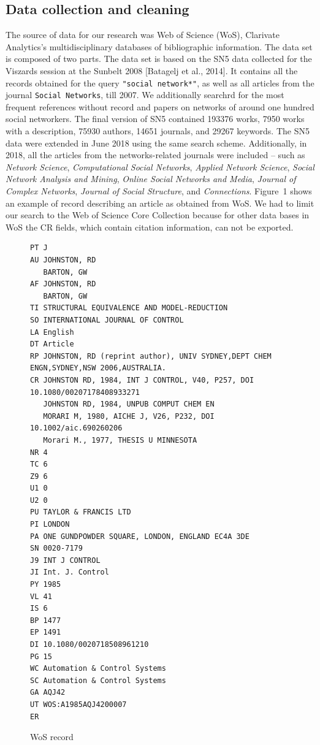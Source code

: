 \documentclass[11pt]{article} %
\newcommand{\Remark}[1]{\ifodd\value{page} \normalmarginpar
 \else \reversemarginpar \fi \marginpar{{\footnotesize #1}} }
\begin{document}
\subsection{Data collection and cleaning}

The source of data for our research was Web of Science (WoS), Clarivate Analytics’s multidisciplinary databases of bibliographic information. The data set is composed of two parts. The data set is based on the  SN5 data collected for the Viszards session at the Sunbelt 2008 [Batagelj et al., 2014]. It contains all the records obtained for the query  \texttt {"social network*"}, as well as all articles from the journal \texttt{Social Networks}, till 2007. We additionally searchrd for the most frequent references without record and papers on networks of around one hundred social networkers. The final version of SN5 contained
 193376 works,  7950 works with a description,  75930 authors,  14651 journals, and  29267 keywords.
The SN5 data were extended  in June 2018 using the same search scheme. Additionally, in 2018, all the articles from the networks-related journals were included -- such as  \textit{Network Science}, \textit{Computational Social Networks}, \textit{Applied Network Science}, \textit{Social Network Analysis and Mining}, \textit{Online Social Networks and Media}, \textit{Journal of Complex  Networks}, \textit{Journal of Social Structure}, and \textit{Connections}. Figure~1 shows an example of record describing an article as obtained from WoS. We had to limit our search to the Web of Science Core Collection because for other data bases in WoS the CR fields, which contain citation information, can not be exported.\Remark{other example?}


\begin{figure}
\renewcommand{\baselinestretch}{0.8}
\scriptsize
\begin{verbatim}
PT J
AU JOHNSTON, RD
   BARTON, GW
AF JOHNSTON, RD
   BARTON, GW
TI STRUCTURAL EQUIVALENCE AND MODEL-REDUCTION
SO INTERNATIONAL JOURNAL OF CONTROL
LA English
DT Article
RP JOHNSTON, RD (reprint author), UNIV SYDNEY,DEPT CHEM ENGN,SYDNEY,NSW 2006,AUSTRALIA.
CR JOHNSTON RD, 1984, INT J CONTROL, V40, P257, DOI 10.1080/00207178408933271
   JOHNSTON RD, 1984, UNPUB COMPUT CHEM EN
   MORARI M, 1980, AICHE J, V26, P232, DOI 10.1002/aic.690260206
   Morari M., 1977, THESIS U MINNESOTA
NR 4
TC 6
Z9 6
U1 0
U2 0
PU TAYLOR & FRANCIS LTD
PI LONDON
PA ONE GUNDPOWDER SQUARE, LONDON, ENGLAND EC4A 3DE
SN 0020-7179
J9 INT J CONTROL
JI Int. J. Control
PY 1985
VL 41
IS 6
BP 1477
EP 1491
DI 10.1080/0020718508961210
PG 15
WC Automation & Control Systems
SC Automation & Control Systems
GA AQJ42
UT WOS:A1985AQJ4200007
ER
\end{verbatim}
\caption{WoS record}\label{wos}
\end{figure}
\end{document}
